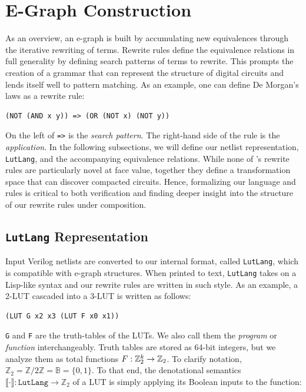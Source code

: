 \section{E-Graph Construction}\label{sec:rewrites}
As an overview, an e-graph is built by accumulating new equivalences through
the iterative rewriting of terms. Rewrite rules define the equivalence
relations in full generality by defining search patterns of terms to rewrite.
This prompts the creation of a grammar that can represent the structure of
digital circuits and lends itself well to pattern matching. As an example, one
can define De Morgan's laws as a rewrite rule:

\begin{lstlisting}
(NOT (AND x y)) => (OR (NOT x) (NOT y))
\end{lstlisting}

On the left of \texttt{=>} is the \textit{search pattern}. The right-hand side
of the rule is the \textit{application}. In the following subsections, we will
define our netlist representation, \texttt{LutLang}, and the accompanying
equivalence relations. While none of \shortname{}'s rewrite rules are
particularly novel at face value, together they define a transformation space
that can discover compacted circuits. Hence, formalizing our language and rules
is critical to both verification and finding deeper insight into the structure
of our rewrite rules under composition.

\subsection{\texttt{LutLang} Representation}\label{sec:rewrites:lutlang}

Input Verilog netlists are converted to our internal format, called
\texttt{LutLang}, which is compatible with e-graph structures. When printed to
text, \texttt{LutLang} takes on a Lisp-like syntax and our rewrite rules are
written in such style. As an example, a 2-LUT cascaded into a 3-LUT is written
as follows:

\begin{lstlisting}
(LUT G x2 x3 (LUT F x0 x1))
\end{lstlisting}

\texttt{G} and \texttt{F} are the truth-tables of the LUTs.
We also call them the \textit{program} or \textit{function} interchangeably.
Truth tables are stored as 64-bit integers, but we analyze them as total functions $F: \mathbb{Z}_{2}^{k} \rightarrow \mathbb{Z}_{2}$.
To clarify notation, $\mathbb{Z}_2 = \mathbb{Z}/2\mathbb{Z} = \mathbb{B} = \{0,1\}$.
To that end, the denotational semantics $\llbracket \cdot \rrbracket : \texttt{LutLang} \rightarrow \mathbb{Z}_2$ of a LUT is simply applying its Boolean inputs to the function:

